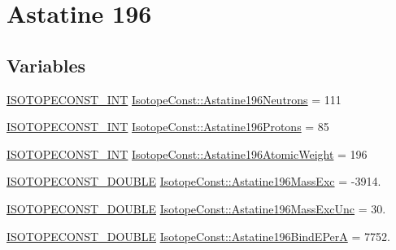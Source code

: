 \hypertarget{group___isotope_const-_astatine-_at196}{}\section{Astatine 196}
\label{group___isotope_const-_astatine-_at196}
\subsection*{Variables}
\begin{DoxyCompactItemize}
\item 
\mbox{\hyperlink{group___isotope_const-_macros_ga5f18360b3e99483a35c32d789e62621c}{I\+S\+O\+T\+O\+P\+E\+C\+O\+N\+S\+T\+\_\+\+I\+NT}} \mbox{\hyperlink{group___isotope_const-_astatine-_at196_ga8a5fa8f8fa7bce66db428ac6965ee40f}{Isotope\+Const\+::\+Astatine196\+Neutrons}} = 111
\item 
\mbox{\hyperlink{group___isotope_const-_macros_ga5f18360b3e99483a35c32d789e62621c}{I\+S\+O\+T\+O\+P\+E\+C\+O\+N\+S\+T\+\_\+\+I\+NT}} \mbox{\hyperlink{group___isotope_const-_astatine-_at196_ga991771f83f218cdcaa05b3329ac3e4be}{Isotope\+Const\+::\+Astatine196\+Protons}} = 85
\item 
\mbox{\hyperlink{group___isotope_const-_macros_ga5f18360b3e99483a35c32d789e62621c}{I\+S\+O\+T\+O\+P\+E\+C\+O\+N\+S\+T\+\_\+\+I\+NT}} \mbox{\hyperlink{group___isotope_const-_astatine-_at196_ga3c38dba09b20d68f138938f843c1b003}{Isotope\+Const\+::\+Astatine196\+Atomic\+Weight}} = 196
\item 
\mbox{\hyperlink{group___isotope_const-_macros_ga8f45a7272ce02c0b4c65c44636ed719a}{I\+S\+O\+T\+O\+P\+E\+C\+O\+N\+S\+T\+\_\+\+D\+O\+U\+B\+LE}} \mbox{\hyperlink{group___isotope_const-_astatine-_at196_ga637a343264fe9157b85055847aaa5ede}{Isotope\+Const\+::\+Astatine196\+Mass\+Exc}} = -\/3914.
\item 
\mbox{\hyperlink{group___isotope_const-_macros_ga8f45a7272ce02c0b4c65c44636ed719a}{I\+S\+O\+T\+O\+P\+E\+C\+O\+N\+S\+T\+\_\+\+D\+O\+U\+B\+LE}} \mbox{\hyperlink{group___isotope_const-_astatine-_at196_gae85f8bca92a4866c2cf397c8068b198d}{Isotope\+Const\+::\+Astatine196\+Mass\+Exc\+Unc}} = 30.
\item 
\mbox{\hyperlink{group___isotope_const-_macros_ga8f45a7272ce02c0b4c65c44636ed719a}{I\+S\+O\+T\+O\+P\+E\+C\+O\+N\+S\+T\+\_\+\+D\+O\+U\+B\+LE}} \mbox{\hyperlink{group___isotope_const-_astatine-_at196_gae7d8965989480c0073e0343260407182}{Isotope\+Const\+::\+Astatine196\+Bind\+E\+PerA}} = 7752.
\item 

\end{DoxyCompactItemize}
